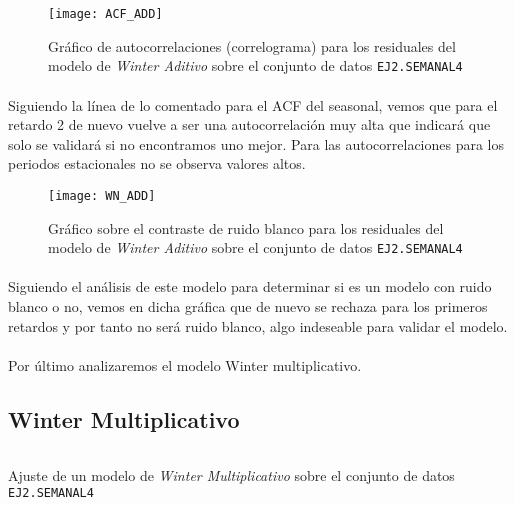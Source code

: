 \documentclass[a4paper, spanish]{article}
\begin{document}
      \begin{figure}[htb!]
        \centering
        \texttt{[image: ACF\_ADD]}
        \caption{Gráfico de autocorrelaciones (correlograma) para los residuales del modelo de \emph{Winter Aditivo} sobre el conjunto de datos \texttt{EJ2.SEMANAL4}}
        \label{img:b_winter_additive_residuals_correlogram}
      \end{figure}

      \paragraph{}
      Siguiendo la línea de lo comentado para el ACF del seasonal, vemos que para el retardo 2 de nuevo vuelve a ser una autocorrelación muy alta que indicará que solo se validará si no encontramos uno mejor. Para las autocorrelaciones para los periodos estacionales no se observa valores altos.

      \begin{figure}[htb!]
        \centering
        \texttt{[image: WN\_ADD]}
        \caption{Gráfico sobre el contraste de ruido blanco para los residuales del modelo de \emph{Winter Aditivo} sobre el conjunto de datos \texttt{EJ2.SEMANAL4}}
        \label{img:b_winter_additive_test_white_noise}
      \end{figure}

      \paragraph{}
      Siguiendo el análisis de este modelo para determinar si es un modelo con ruido blanco o no, vemos en dicha gráfica que de nuevo se rechaza para los primeros retardos y por tanto no será ruido blanco, algo indeseable para validar el modelo.

      \paragraph{}
      Por último analizaremos el modelo Winter multiplicativo.

    \subsection{Winter Multiplicativo}

      \begin{listing}[htb!]
        \centering
        \inputminted{SAS}{./res/code/b-01-esm-wintermul.sas}
        \caption{Ajuste de un modelo de \emph{Winter Multiplicativo} sobre el conjunto de datos \texttt{EJ2.SEMANAL4}}
        \label{code:b_winter_multiplicative_esm}
      \end{listing}
\end{document}
